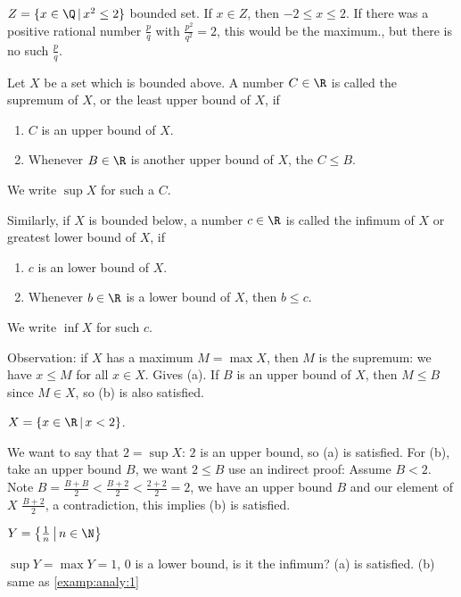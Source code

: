 \documentclass[10pt, a4paper]{article}
\begin{document}
\begin{example}
    $Z = \{x \in \Q\,|\, x ^ 2 \leq 2\}$ bounded set.
    If $x \in Z$,
    then $-2 \leq x \leq 2$.
    If there was a positive rational number $\frac{p}{q}$ with $\frac{p ^ 2}{q ^ 2} = 2$,
    this would be the maximum.,
    but there is no such $\frac{p}{q}$.
\end{example}

\begin{definition}
    Let $X$ be a set which is bounded above.
    A number $C \in \R$ is called the supremum of $X$,
    or the least upper bound of $X$, if
    \begin{enumerate}[label = (\alph*)]
        \item $C$ is an upper bound of $X$.
        \item Whenever $B \in \R$ is another upper bound of $X$, the $C \leq B$.
    \end{enumerate}
    We write $\sup X$ for such a $C$.
    
    Similarly, if $X$ is bounded below,
    a number $c \in \R$ is called the infimum of $X$ or greatest lower bound of $X$, if
    \begin{enumerate}[label = (\alph*)]
        \item $c$ is an lower bound of $X$.
        \item Whenever $b \in \R$ is a lower bound of $X$, then $b \leq c$.
    \end{enumerate}
    We write $\inf X$ for such $c$.
\end{definition}

Observation: if $X$ has a maximum $M = \max X$,
then $M$ is the supremum:
we have $x \leq M$ for all $x \in X$.
Gives (a).
If $B$ is an upper bound of $X$,
then $M \leq B$ since $M \in X$,
so (b) is also satisfied.

\begin{example}
    $X = \{x \in \R\,|\, x < 2\}$.

    We want to say that $2 = \sup X$:
    $2$ is an upper bound,
    so (a) is satisfied.
    For (b), take an upper bound $B$,
    we want $2 \leq B$
    use an indirect proof:
    Assume $B < 2$.
    Note $B = \frac{B + B}{2} < \frac{B + 2}{2} < \frac{2 + 2}{2} = 2$,
    we have an upper bound $B$ and our element of $X$ $\frac{B + 2}{2}$,
    a contradiction,
    this implies (b) is satisfied.
\end{example}

\begin{example}\label{examp:analy:2}
    $Y = \left\{\frac{1}{n}\,\middle|\, n \in \N\right\}$

    $\sup Y = \max Y = 1$,
    $0$ is a lower bound,
    is it the infimum?
    (a) is satisfied.
    (b) same as \autoref{examp:analy:1}
\end{example}
\end{document}
